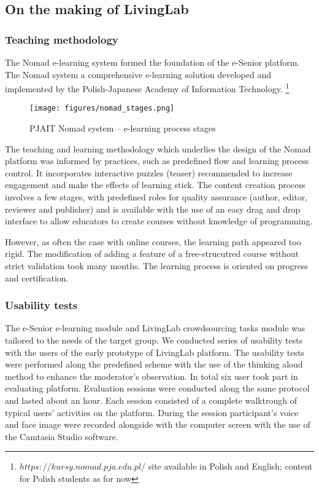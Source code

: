 \documentclass[sigconf]{acmart}
\begin{document}
\subsection{On the making of LivingLab}

\subsubsection{Teaching methodology}

The Nomad e-learning system formed the foundation of the e-Senior platform. The Nomad system a comprehensive e-learning solution developed and implemented by the Polish-Japanese Academy of Information Technology.  \footnote{$https://kursy.nomad.pja.edu.pl/$ site available in Polish and English; content for Polish students as for now}

\begin{figure}
\centering
\texttt{[image: figures/nomad\_stages.png]}
\caption{PJAIT Nomad system -- e-learning process stages}
\label{fig:nomad}
\end{figure}

The teaching and learning methodology which underlies the design of the Nomad platform was informed by practices, such as predefined flow and learning process control. It incorporates interactive puzzles (teaser) recommended to increase engagement and make the effects of learning stick. The content creation process involves a few stages, with predefined roles for quality assurance (author, editor, reviewer and publisher) and is available with the use of an easy drag and drop interface to allow educators to create courses without knowledge of programming.

However, as often the case with online courses, the learning path appeared too rigid. The modification of adding a feature of a free-strucutred course without strict validation took many months. The learning process is oriented on progress and certification.

\subsubsection{Usability tests}

The e-Senior e-learning module and LivingLab crowdsourcing tasks module was tailored to the needs of the target group. We conducted series of usability tests with the users of the early prototype of LivingLab platform. The usability tests were performed along the predefined scheme with the use of the thinking aloud method to enhance the moderator's observation. In total six user took part in evaluating platform. 
Evaluation sessions were conducted along the same protocol and lasted about an hour. Each session consisted of a complete walktrough of typical users' activities on the platform. During the session participant's voice and face image were recorded alongside with the computer screen with the use of the Camtasia Studio software.
\end{document}
